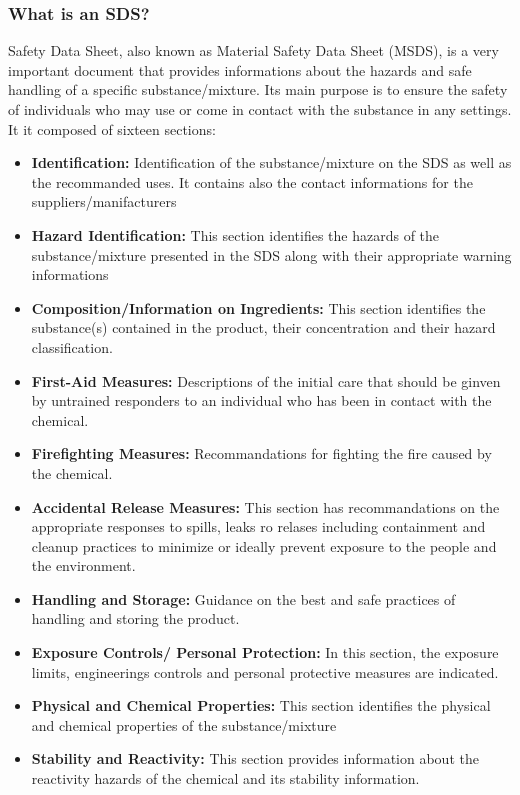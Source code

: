 \documentclass[a4paper,12pt,twoside]{report}
\begin{document}
\subsubsection{What is an SDS?}\label{sds?}
Safety Data Sheet, also known as Material Safety Data Sheet (MSDS), is a very important document that provides informations about the hazards and safe handling of a specific substance/mixture. Its main purpose is to ensure the safety of individuals who may use or come in contact with the substance in any settings. It it composed of sixteen sections:
\begin{itemize}
\item \textbf{Identification:} Identification of the substance/mixture on the SDS as well as the recommanded uses. It contains also the contact informations for the suppliers/manifacturers
\item  \textbf{Hazard Identification:} This section identifies the hazards of the substance/mixture presented in the SDS along with their appropriate warning informations
\item  \textbf{Composition/Information on Ingredients:} This section identifies the substance(s) contained in the product, their concentration and their hazard classification.
\item \textbf{First-Aid Measures:} Descriptions of the initial care that should be ginven by untrained responders to an individual who has been in contact with the chemical.
\item \textbf{Firefighting Measures:} Recommandations for fighting the fire caused by the chemical.
\item \textbf{Accidental Release Measures:} This section has recommandations on the appropriate responses to spills, leaks ro relases including containment and cleanup practices to minimize or ideally prevent exposure to the people and the environment.
\item \textbf{Handling and Storage:} Guidance on the best and safe practices of handling and storing the product.
\item \textbf{Exposure Controls/ Personal Protection:} In this section, the exposure limits, engineerings controls and personal protective measures are indicated.
\item \textbf{Physical and Chemical Properties:} This section identifies the physical and chemical properties of the substance/mixture
\item \textbf{Stability and Reactivity:} This section provides information about the reactivity hazards of the chemical and its stability information.

\end{itemize}
\end{document}
